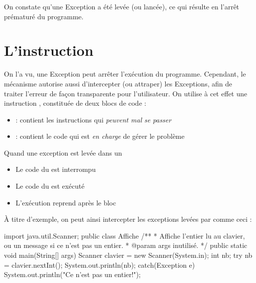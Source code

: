 On constate qu'une Exception a été levée (ou \og lancée\fg), ce qui résulte en l'arrêt prématuré du programme.


\section{L'instruction }
On l'a vu, une Exception peut arrêter l'exécution du programme. Cependant, le mécanisme autorise aussi d'intercepter (ou \og attraper\fg) les Exceptions, afin de traiter l'erreur de façon transparente pour l'utilisateur. On utilise à cet effet une instruction , constituée de deux blocs de code :
\begin{itemize}
\item {} : contient les instructions qui \emph{peuvent mal se passer}
\item {} : contient le code qui est \emph{en charge} de gérer le problème
\end{itemize}

Quand une exception est levée dans un 
\begin{itemize}
\item Le code du  est interrompu
\item Le code du  est exécuté
\item L'exécution reprend après le bloc 
\end{itemize}

À titre d'exemple, on peut ainsi intercepter les exceptions levées par  comme ceci :
\begin{java}
import java.util.Scanner;
public class Affiche {
  /**
   * Affiche l'entier lu au clavier, ou un message si ce n'est pas un entier.
   * @param args inutilisé.
   */
  public static void main(String[] args) {
      Scanner clavier = new Scanner(System.in);
      int nb;
      try { 
        nb = clavier.nextInt();
        System.out.println(nb);
      }
      catch(Exception e) { 
        System.out.println("Ce n'est pas un entier!");
      }
  }
}
\end{java}

